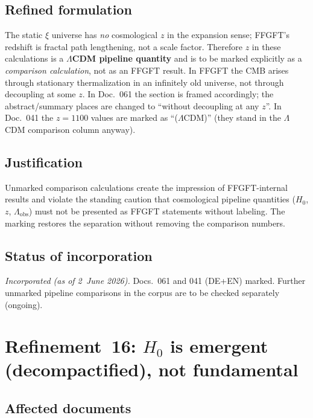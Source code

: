 \subsection*{Refined formulation}

The static $\xi$ universe has \emph{no} cosmological $z$ in the expansion
sense; FFGFT's redshift is fractal path lengthening, not a scale factor.
Therefore $z$ in these calculations is a \textbf{$\Lambda$CDM pipeline
quantity} and is to be marked explicitly as a \emph{comparison calculation},
not as an FFGFT result. In FFGFT the CMB arises through stationary
thermalization in an infinitely old universe, not through decoupling at some
$z$. In Doc.~061 the section is framed accordingly; the abstract/summary places
are changed to \enquote{without decoupling at any $z$}. In Doc.~041 the
$z=1100$ values are marked as \enquote{($\Lambda$CDM)} (they stand in the
$\Lambda$CDM comparison column anyway).

\subsection*{Justification}

Unmarked comparison calculations create the impression of FFGFT-internal
results and violate the standing caution that cosmological pipeline quantities
($H_0$, $z$, $\Lambda_{\text{obs}}$) must not be presented as FFGFT statements
without labeling. The marking restores the separation without removing the
comparison numbers.

\subsection*{Status of incorporation}

\emph{Incorporated (as of 2~June 2026).} Docs.~061 and 041 (DE+EN) marked.
Further unmarked pipeline comparisons in the corpus are to be checked
separately (ongoing).

\section{\texorpdfstring{Refinement~16: $H_0$ is emergent (decompactified), not fundamental}{Refinement 16: H0 is emergent, not fundamental}}

\subsection*{Affected documents}

